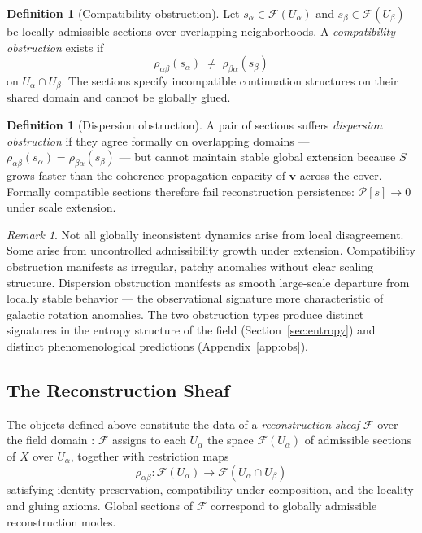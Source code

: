 \documentclass[11pt, a4paper]{article}
\theoremstyle{plain}
\theoremstyle{definition}
\newtheorem{definition}[theorem]{Definition}
\theoremstyle{remark}
\newtheorem{remark}[theorem]{Remark}
\newcommand{\sheaf}{\mathcal{F}}
\begin{document}
\begin{definition}[Compatibility obstruction]
\label{def:compat-obs}
Let $s_\alpha \in \sheaf(U_\alpha)$ and $s_\beta \in \sheaf(U_\beta)$ be locally
admissible sections over overlapping neighborhoods. A \emph{compatibility
obstruction} exists if
\[
  \rho_{\alpha\beta}(s_\alpha) \;\neq\; \rho_{\beta\alpha}(s_\beta)
\]
on $U_\alpha \cap U_\beta$. The sections specify incompatible continuation structures
on their shared domain and cannot be globally glued.
\end{definition}

\begin{definition}[Dispersion obstruction]
\label{def:disp-obs}
A pair of sections suffers \emph{dispersion obstruction} if they agree formally on
overlapping domains --- $\rho_{\alpha\beta}(s_\alpha) = \rho_{\beta\alpha}(s_\beta)$
--- but cannot maintain stable global extension because $S$ grows faster than the
coherence propagation capacity of $\mathbf{v}$ across the cover. Formally compatible
sections therefore fail reconstruction persistence: $\mathcal{P}[s] \to 0$ under
scale extension.
\end{definition}

\begin{remark}
Not all globally inconsistent dynamics arise from local disagreement. Some arise from
uncontrolled admissibility growth under extension. Compatibility obstruction manifests
as irregular, patchy anomalies without clear scaling structure. Dispersion obstruction
manifests as smooth large-scale departure from locally stable behavior --- the
observational signature more characteristic of galactic rotation anomalies. The two
obstruction types produce distinct signatures in the entropy structure of the field
(Section~\ref{sec:entropy}) and distinct phenomenological predictions
(Appendix~\ref{app:obs}).
\end{remark}

\subsection{The Reconstruction Sheaf}

The objects defined above constitute the data of a \emph{reconstruction sheaf}
$\sheaf$ over the field domain \cite{bredon1997,kashiwara2005}: $\sheaf$ assigns to
each $U_\alpha$ the space $\sheaf(U_\alpha)$ of admissible sections of $X$ over
$U_\alpha$, together with restriction maps
\[
  \rho_{\alpha\beta} \colon \sheaf(U_\alpha) \longrightarrow \sheaf(U_\alpha \cap U_\beta)
\]
satisfying identity preservation, compatibility under composition, and the locality
and gluing axioms. Global sections of $\sheaf$ correspond to globally admissible
reconstruction modes.
\end{document}
